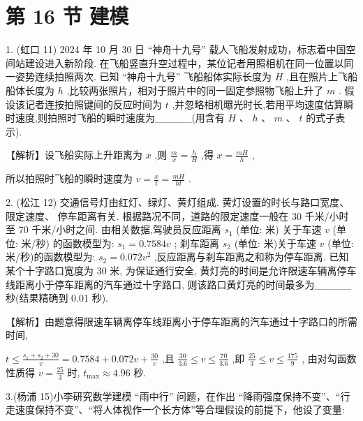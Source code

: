 \documentclass[10pt]{article}
\begin{document}
\section*{第 16 节 建模}

1. (虹口 11) 2024 年 10 月 30 日 “神舟十九号” 载人飞船发射成功，标志着中国空间站建设进入新阶段. 在飞船竖直升空过程中，某位记者用照相机在同一位置以同一姿势连续拍照两次. 已知 “神舟十九号” 飞船船体实际长度为 \(H\) ,且在照片上飞船船体长度为 \(h\) ,比较两张照片，相对于照片中的同一固定参照物飞船上升了 \(m\) . 假设该记者连按拍照键间的反应时间为 \(t\) ,并忽略相机曝光时长,若用平均速度估算瞬时速度,则拍照时飞船的瞬时速度为\_\_\_\_\_(用含有 \(H\text{ 、 }h\text{ 、 }m\text{ 、 }t\) 的式子表示).

【解析】设飞船实际上升距离为 \(x\) ,则 \(\frac{m}{x} = \frac{h}{H}\) ,得 \(x = \frac{mH}{h}\) ,

所以拍照时飞船的瞬时速度为 \(v = \frac{x}{t} = \frac{mH}{ht}\) .

2. (松江 12) 交通信号灯由红灯、绿灯、黄灯组成. 黄灯设置的时长与路口宽度、限定速度、 停车距离有关. 根据路况不同，道路的限定速度一般在 30 千米/小时至 70 千米/小时之间. 由相关数据,驾驶员反应距离 \({s}_{1}\) (单位: 米) 关于车速 \(v\) (单位: 米/秒) 的函数模型为: \({s}_{1} = {0.7584v}\) ; 刹车距离 \({s}_{2}\) (单位: 米)关于车速 \(v\) (单位: 米/秒)的函数模型为: \({s}_{2} = {0.072}{v}^{2}\) ,反应距离与刹车距离之和称为停车距离. 已知某个十字路口宽度为 30 米, 为保证通行安全, 黄灯亮的时间是允许限速车辆离停车线距离小于停车距离的汽车通过十字路口, 则该路口黄灯亮的时间最多为\_\_\_\_\_秒(结果精确到 0.01 秒).

【解析】由题意得限速车辆离停车线距离小于停车距离的汽车通过十字路口的所需时间,

\(t \leq  \frac{{s}_{1} + {s}_{2} + {30}}{v} = {0.7584} + {0.072v} + \frac{30}{v}\) ,且 \(\frac{30}{3.6} \leq  v \leq  \frac{70}{3.6}\) ,即 \(\frac{25}{3} \leq  v \leq  \frac{175}{9}\) , 由对勾函数性质得 \(v = \frac{25}{3}\) 时, \({t}_{\max } \approx  {4.96}\) 秒.

3.(杨浦 15)小李研究数学建模 “雨中行” 问题，在作出 “降雨强度保持不变”、“行走速度保持不变”、“将人体视作一个长方体”等合理假设的前提下，他设了变量:

\begin{center}
\end{center}
\end{document}
